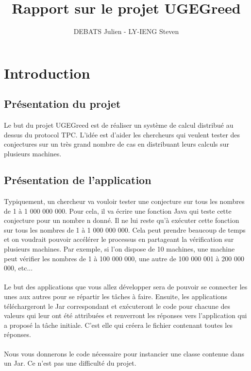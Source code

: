 \documentclass[a4paper,titlepage]{report}
\title{Rapport sur le projet UGEGreed}
\date{}
\author{DEBATS Julien - LY-IENG Steven}
\begin{document}
\maketitle
\tableofcontents
\pagebreak
\section{Introduction}
\subsection{Présentation du projet}
\paragraph{}
Le but du projet UGEGreed est de réaliser un système de calcul distribué au dessus du protocol TPC. L'idée est d'aider les chercheurs qui veulent tester des conjectures sur un très grand nombre de cas en distribuant leurs calculs sur plusieurs machines.
\subsection{Présentation de l'application}
\paragraph{}
Typiquement, un chercheur va vouloir tester une conjecture sur tous les nombres de 1 à 1 000 000 000. Pour cela, il va écrire une fonction Java qui teste cette conjecture pour un nombre n donné. Il ne lui reste qu'à exécuter cette fonction sur tous les nombres de 1 à 1 000 000 000. Cela peut prendre beaucoup de temps et on voudrait pouvoir accélérer le processus en partageant la vérification sur plusieurs machines. Par exemple, si l'on dispose de 10 machines, une machine peut vérifier les nombres de 1 à 100 000 000, une autre de 100 000 001 à 200 000 000, etc...
\paragraph{}
Le but des applications que vous allez développer sera de pouvoir se connecter les unes aux autres pour se répartir les tâches à faire. Ensuite, les applications téléchargeront le Jar correspondant et exécuteront le code pour chacune des valeurs qui leur ont été attribuées et renverront les réponses vers l'application qui a proposé la tâche initiale. C'est elle qui créera le fichier contenant toutes les réponses.
\paragraph{}
Nous vous donnerons le code nécessaire pour instancier une classe contenue dans un Jar. Ce n'est pas une difficulté du projet.
\end{document}
